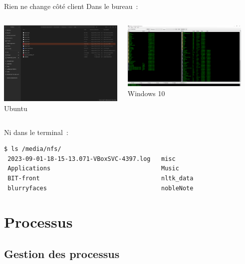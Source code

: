\documentclass{beamer}
\begin{document}
    \begin{frame}[fragile]{Rien ne change côté client}
        Dans le bureau~:
        \begin{columns}
            \begin{center}
                \includegraphics[width=6cm]{image/nfs-linux} \\ Ubuntu \\
            \end{center}
            \begin{center}
                \includegraphics[width=6cm]{image/nfs-windows} \\ Windows 10 \\
            \end{center}
        \end{columns}
        \bigbreak
        Ni dans le terminal~:
        \begin{lstlisting}[language=bash]
$ ls /media/nfs/
 2023-09-01-18-15-13.071-VBoxSVC-4397.log   misc
 Applications                               Music
 BIT-front                                  nltk_data
 blurryfaces                                nobleNote
        \end{lstlisting}
    \end{frame}


    \section{Processus}\label{sec:processus}

    \subsection{Gestion des processus}\label{subsec:process-management}
\end{document}
